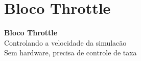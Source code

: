 \documentclass[aspectratio=169]{beamer}
\begin{document}
\section{Bloco Throttle}

{
\begin{frame}[plain,c]
\begin{center}
{\Huge\textbf{Bloco Throttle}}\\[0.8cm]
{\LARGE Controlando a velocidade da simulac\~{a}o}\\[0.5cm]
{\large Sem hardware, precisa de controle de taxa}
\end{center}
\end{frame}
}
\end{document}
